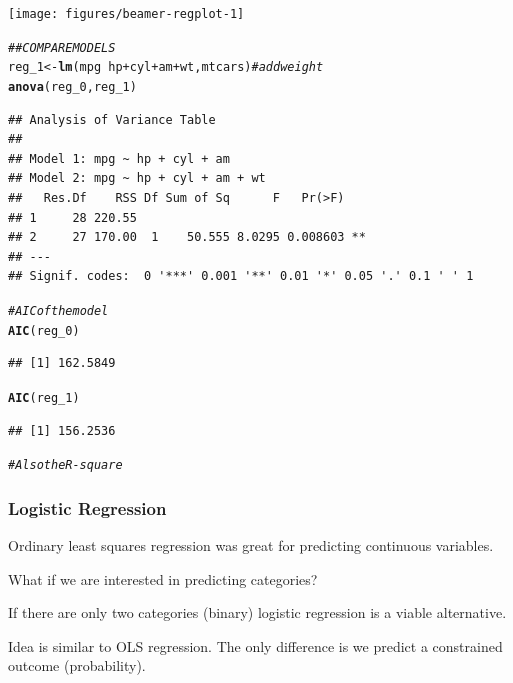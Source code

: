 \documentclass{beamer}\usepackage[]{graphicx}\usepackage[]{color}
\makeatletter
\newcommand{\hlcom}[1]{\textcolor[rgb]{0.678,0.584,0.686}{\textit{#1}}}%
\newcommand{\hlopt}[1]{\textcolor[rgb]{0,0,0}{#1}}%
\newcommand{\hlstd}[1]{\textcolor[rgb]{0.345,0.345,0.345}{#1}}%
\newcommand{\hlkwb}[1]{\textcolor[rgb]{0.69,0.353,0.396}{#1}}%
\newcommand{\hlkwd}[1]{\textcolor[rgb]{0.737,0.353,0.396}{\textbf{#1}}}%
\newenvironment{kframe}{%
 \def\at@end@of@kframe{}%
 \ifinner\ifhmode%
  \def\at@end@of@kframe{\end{minipage}}%
  \begin{minipage}{\columnwidth}%
 \fi\fi%
 \def\FrameCommand##1{\hskip\@totalleftmargin \hskip-\fboxsep
 \colorbox{shadecolor}{##1}\hskip-\fboxsep
     \hskip-\linewidth \hskip-\@totalleftmargin \hskip\columnwidth}%
 \MakeFramed {\advance\hsize-\width
   \@totalleftmargin\z@ \linewidth\hsize
   \@setminipage}}%
 {\par\unskip\endMakeFramed%
 \at@end@of@kframe}
\newenvironment{knitrout}{}{} %
\makeatother
\begin{document}
\begin{frame}
\begin{knitrout}
{\centering \texttt{[image: figures/beamer-regplot-1]} 

}



\end{knitrout}

\begin{knitrout}\scriptsize
{}\color{fgcolor}\begin{kframe}
\begin{alltt}
\hlcom{## COMPARE MODELS}
\hlstd{reg_1} \hlkwb{<-} \hlkwd{lm}\hlstd{(mpg} \hlopt{~} \hlstd{hp} \hlopt{+} \hlstd{cyl} \hlopt{+} \hlstd{am} \hlopt{+} \hlstd{wt, mtcars)}  \hlcom{# add weight}
\hlkwd{anova}\hlstd{(reg_0, reg_1)}
\end{alltt}
\begin{verbatim}
## Analysis of Variance Table
## 
## Model 1: mpg ~ hp + cyl + am
## Model 2: mpg ~ hp + cyl + am + wt
##   Res.Df    RSS Df Sum of Sq      F   Pr(>F)   
## 1     28 220.55                                
## 2     27 170.00  1    50.555 8.0295 0.008603 **
## ---
## Signif. codes:  0 '***' 0.001 '**' 0.01 '*' 0.05 '.' 0.1 ' ' 1
\end{verbatim}
\begin{alltt}
\hlcom{# AIC of the model}
\hlkwd{AIC}\hlstd{(reg_0)}
\end{alltt}
\begin{verbatim}
## [1] 162.5849
\end{verbatim}
\begin{alltt}
\hlkwd{AIC}\hlstd{(reg_1)}
\end{alltt}
\begin{verbatim}
## [1] 156.2536
\end{verbatim}
\begin{alltt}
\hlcom{# Also the R-square}
\end{alltt}
\end{kframe}
\end{knitrout}

\end{frame}



\begin{frame}
\frametitle{Logistic Regression}

Ordinary least squares regression was great for predicting continuous variables.\vfill

What if we are interested in predicting categories?\vfill

If there are only two categories (binary) logistic regression is a viable alternative.\vfill

Idea is similar to OLS regression. The only difference is we predict a constrained outcome (probability).

\end{frame}
\end{document}
